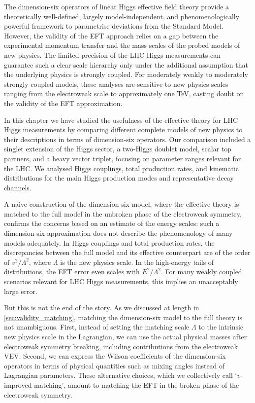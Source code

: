 The dimension-six operators of linear Higgs effective field theory
provide a theoretically well-defined, largely model-independent, and
phenomenologically powerful framework to parametrise deviations from
the Standard Model. However, the validity of the EFT approach relies
on a gap between the experimental momentum transfer and the mass
scales of the probed models of new physics. The limited precision of
the LHC Higgs measurements can guarantee such a clear scale hierarchy
only under the additional assumption that the underlying physics is
strongly coupled. For moderately weakly to moderately strongly coupled
models, these analyses are sensitive to new physics scales ranging
from the electroweak scale to approximately one TeV, casting doubt on
the validity of the EFT approximation.

In this chapter we have studied the usefulness of the effective theory
for LHC Higgs measurements by comparing different complete models of
new physics to their descriptions in terms of dimension-six
operators. Our comparison included a singlet extension of the Higgs
sector, a two-Higgs doublet model, scalar top partners, and a heavy
vector triplet, focusing on parameter ranges relevant for the LHC. We
analysed Higgs couplings, total production rates, and kinematic
distributions for the main Higgs production modes and representative
decay channels.

A naive construction of the dimension-six model, where the effective
theory is matched to the full model in the unbroken phase of the
electroweak symmetry, confirms the concerns based on an estimate of
the energy scales: such a dimension-six approximation does not
describe the phenomenology of many models adequately. In Higgs
couplings and total production rates, the discrepancies between the
full model and its effective counterpart are of the order of
$v^2 / \Lambda^2$, where $\Lambda$ is the new physics scale. In the
high-energy tails of distributions, the EFT error even scales with
$E^2 / \Lambda^2$. For many weakly coupled scenarios relevant for LHC
Higgs measurements, this implies an unacceptably large error.

But this is not the end of the story. As we discussed at length in
\autoref{sec:validity_matching}, matching the dimension-six model to
the full theory is not unambiguous. First, instead of setting the
matching scale $\Lambda$ to the intrinsic new physics scale in the
Lagrangian, we can use the actual physical masses after electroweak
symmetry breaking, including contributions from the electroweak
VEV. Second, we can express the Wilson coefficients of the
dimension-six operators in terms of physical quantities such as mixing
angles instead of Lagrangian parameters. These alternative choices,
which we collectively call `$v$-improved matching', amount to
matching the EFT in the broken phase of the electroweak symmetry.

